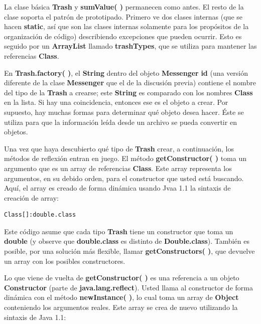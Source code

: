 \documentclass{article}
\begin{document}
La clase básica \textbf{Trash} y \textbf{sumValue( )} permanecen como antes. El resto de la clase soporta el patrón de prototipado. Primero ve dos clases internas (que se hacen \textbf{static}, así que son las clases internas solamente para los propósitos de la organización de código) describiendo excepciones que pueden ocurrir. Esto es seguido por un  \textbf{ArrayList} llamado \textbf{trashTypes}, que se utiliza para mantener las referencias \textbf{Class}.    \newline

En \textbf{Trash.factory( )}, el \textbf{String} dentro del objeto \textbf{Messenger} \textbf{id} (una versión diferente de la clase \textbf{Messenger} que el de la discusión previa) contiene el nombre del tipo de la \textbf{Trash} a crearse; este \textbf{String} es comparado con los nombres \textbf{Class} en la lista. Si hay una coincidencia, entonces ese es el objeto a crear. Por supuesto, hay muchas formas para determinar qué objeto desea hacer. Éste se utiliza para que la información leída desde un archivo se pueda convertir en objetos.    \newline

Una vez que haya descubierto qué tipo de \textbf{Trash} crear, a continuación, los métodos de reflexión entran en juego. El método \textbf{getConstructor( )} toma un argumento que es un array de referencias \textbf{Class}. Este array representa los argumentos, en su debido orden, para el constructor que usted está buscando. Aquí, el array es creado de forma dinámica usando Jvaa 1.1 la sintaxis de creación de array:  \newline

\begin{lstlisting} 
Class[]:double.class
\end{lstlisting}

Este código asume que cada tipo \textbf{Trash} tiene un constructor que toma un \textbf{double} (y observe que \textbf{double.class} es distinto de \textbf{Double.class}). También es posible, por una solución más flexible, llamar \textbf{getConstructors( )}, que devuelve un array con los posibles constructores.  \newline

Lo que viene de vuelta de \textbf{getConstructor( )} es una referencia a un objeto \textbf{Constructor} (parte de \textbf{java.lang.reflect}). Usted llama al constructor de forma dinámica con el método \textbf{newInstance( )}, lo cual toma un array de \textbf{Object} conteniendo los argumentos reales. Este array se crea de nuevo utilizando la sintaxis de Java 1.1:    \newline
\end{document}
